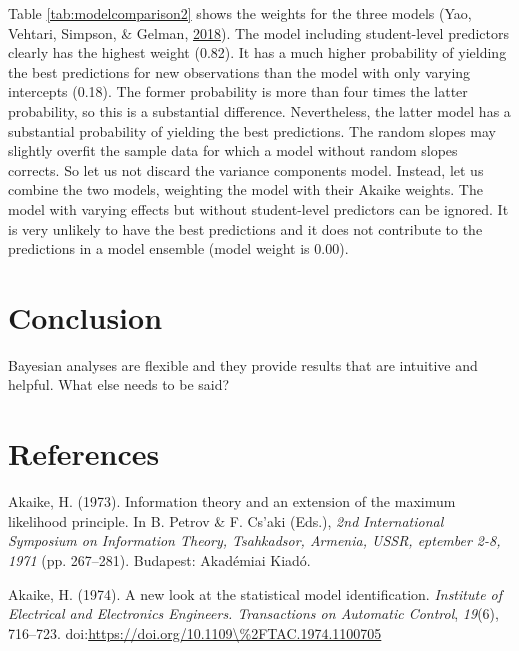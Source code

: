 \documentclass[doc]{apa6}
\begin{document}
Table \ref{tab:modelcomparison2} shows the weights for the three models
(Yao, Vehtari, Simpson, \& Gelman,
\protect\hyperlink{ref-YaoUsingStackingAverage2018}{2018}). The model
including student-level predictors clearly has the highest weight
(0.82). It has a much higher probability of yielding the best
predictions for new observations than the model with only varying
intercepts (0.18). The former probability is more than four times the
latter probability, so this is a substantial difference. Nevertheless,
the latter model has a substantial probability of yielding the best
predictions. The random slopes may slightly overfit the sample data for
which a model without random slopes corrects. So let us not discard the
variance components model. Instead, let us combine the two models,
weighting the model with their Akaike weights. The model with varying
effects but without student-level predictors can be ignored. It is very
unlikely to have the best predictions and it does not contribute to the
predictions in a model ensemble (model weight is 0.00).

\section{Conclusion}\label{conclusion}

Bayesian analyses are flexible and they provide results that are
intuitive and helpful. What else needs to be said?

\newpage

\section{References}\label{references}

\begingroup
\setlength{\parindent}{-0.5in} \setlength{\leftskip}{0.5in}

\hypertarget{refs}{}
\hypertarget{ref-AkaikeInformationtheoryextension1973}{}
Akaike, H. (1973). Information theory and an extension of the maximum
likelihood principle. In B. Petrov \& F. Cs\a'aki (Eds.), \emph{2nd
International Symposium on Information Theory, Tsahkadsor, Armenia,
USSR, eptember 2-8, 1971} (pp. 267--281). Budapest: Akadémiai Kiadó.

\hypertarget{ref-akaikeNewLookStatistical1974}{}
Akaike, H. (1974). A new look at the statistical model identification.
\emph{Institute of Electrical and Electronics Engineers. Transactions on
Automatic Control}, \emph{19}(6), 716--723.
doi:\href{https://doi.org/https://doi.org/10.1109/\%2FTAC.1974.1100705}{https://doi.org/10.1109\textbackslash{}\%2FTAC.1974.1100705}
\end{document}
